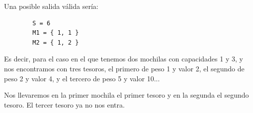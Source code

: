         Una posible salida válida sería:

        \begin{verbatim}
        S = 6
        M1 = { 1, 1 } 
        M2 = { 1, 2 }
        \end{verbatim}

        Es decir, para el caso en el que tenemos dos mochilas con capacidades 1 y 3, y nos encontramos con tres tesoros, el primero de peso 1 y valor 2, el segundo de peso 2 y valor 4, y el tercero de peso 5 y valor 10... \par Nos llevaremos en la primer mochila el primer tesoro y en la segunda el segundo tesoro. El tercer tesoro ya no nos entra.

